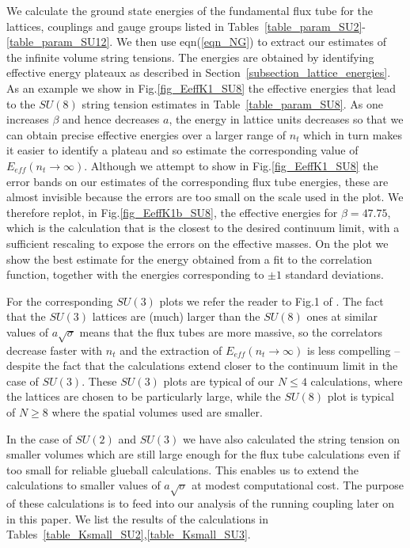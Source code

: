\documentclass[12pt]{article}
\begin{document}
We calculate the ground state energies of the fundamental flux tube for the lattices, couplings
and gauge groups listed in Tables~\ref{table_param_SU2}-\ref{table_param_SU12}.
We then use eqn(\ref{eqn_NG}) to extract our estimates of the infinite volume string tensions.
The energies are obtained by identifying effective energy plateaux as described in
Section~\ref{subsection_lattice_energies}.
As an example we show in Fig.\ref{fig_EeffK1_SU8} the effective energies
that lead to the $SU(8)$ string tension estimates in Table~\ref{table_param_SU8}.
As one increases $\beta$ and hence decreases $a$, the energy in lattice units decreases
so that we can obtain precise effective energies over a larger range of $n_t$
which in turn makes it easier to identify a plateau and so estimate the corresponding
value of $E_{eff}(n_t\to\infty)$. Although we attempt to show in Fig.\ref{fig_EeffK1_SU8}
the error bands on our estimates of the corresponding flux tube energies, these are
almost invisible because the errors are too small on the scale used in the plot.
We therefore replot, in Fig.\ref{fig_EeffK1b_SU8}, the effective energies for $\beta=47.75$,
which is the calculation that is the closest to the desired continuum limit,
with a sufficient rescaling to expose
the errors on the effective masses. On the plot we show the best estimate for the
energy obtained from a fit to the correlation function, together with the
energies corresponding to $\pm 1$ standard deviations.


For the corresponding $SU(3)$ plots we refer the reader
to Fig.1 of
%
\cite{AAMT-2020}.
%
The fact that the $SU(3)$ lattices are (much) larger than the $SU(8)$ ones at similar
values of $a\surd\sigma$ means that the flux tubes are more massive, so the correlators
decrease faster with $n_t$ and the extraction of $E_{eff}(n_t\to\infty)$ is less
compelling -- despite the fact that the calculations extend closer to the continuum
limit in the case of $SU(3)$. These $SU(3)$ plots are typical of our  $N \leq 4$
calculations, where the lattices are chosen to be particularly large, while the $SU(8)$
plot is typical of  $N \geq 8$ where the spatial volumes used are smaller.

In the case of $SU(2)$ and $SU(3)$ we have also calculated the string tension on
smaller volumes which are still large enough for the flux tube calculations even if too
small for reliable glueball calculations.
This enables us to extend the calculations to smaller values of
$a\surd\sigma$ at modest computational cost. The purpose of these calculations
is to feed into our analysis of the running coupling later on in this paper. We list
the results of the calculations in Tables~\ref{table_Ksmall_SU2},\ref{table_Ksmall_SU3}.
%
%
\end{document}
